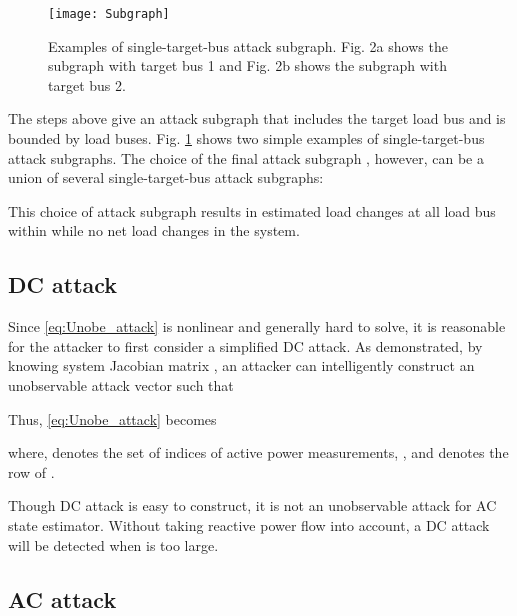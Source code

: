 \documentclass[twocolumn,english,final,journal]{IEEEtran}
\theoremstyle{plain}
\theoremstyle{definition}
\begin{document}
\begin{figure}
\texttt{[image: Subgraph]}
\caption{Examples of single-target-bus attack subgraph. Fig. 2a shows the subgraph
with target bus 1 and Fig. 2b shows the subgraph with target bus 2.}
\label{fig:Figure 1} 
\end{figure}
The steps above give an attack subgraph that includes the target load
bus and is bounded by load buses. Fig. \ref{fig:Figure 1} shows two
simple examples of single-target-bus attack subgraphs. The choice
of the final attack subgraph , however, can be a union
of several single-target-bus attack subgraphs:

This choice of attack subgraph results in estimated load changes at
all load bus within  while no net load changes in the
system. 

\subsection{DC attack \label{sub:DC-attack}}

Since \eqref{eq:Unobe_attack} is nonlinear and generally hard to
solve, it is reasonable for the attacker to first consider a simplified
DC attack. As  demonstrated, by knowing system Jacobian
matrix , an attacker can intelligently construct an unobservable
attack vector  such that 

Thus, \eqref{eq:Unobe_attack} becomes

where,  denotes the set of indices of active power
measurements, ,
and  denotes the  row of .

Though DC attack is easy to construct, it is not an unobservable attack
for AC state estimator. Without taking reactive power flow into account,
a DC attack will be detected when  is too large.

\subsection{AC attack \label{sub:AC-attack}}
\end{document}
